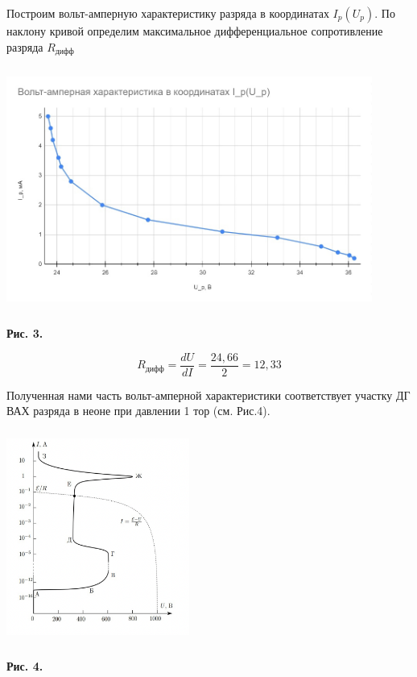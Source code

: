 \documentclass [a4paper, 12pt]{article}
\begin{document}
    Построим вольт-амперную характеристику разряда в координатах $I_p(U_p)$. По наклону кривой определим максимальное дифференциальное сопротивление разряда $R_{дифф}$

\begin{center}
\includegraphics[width=12cm, height=8cm]{vax_351.jpg}
\end{center}
\begin{flushright}
{\small \textbf{Рис. 3.} }
\end{flushright}

\[R_{дифф} = \frac{dU}{dI} = \frac{24,66}{2} = 12,33\]

    Полученная нами часть вольт-амперной характеристики соответствует участку ДГ ВАХ разряда в неоне при давлении  1 тор (см. Рис.4).

\begin{center}
\includegraphics[width=6cm, height=7cm]{vax 351.jpg}
\end{center}
\begin{flushright}
{\small \textbf{Рис. 4.} }
\end{flushright}   
\end{document}

